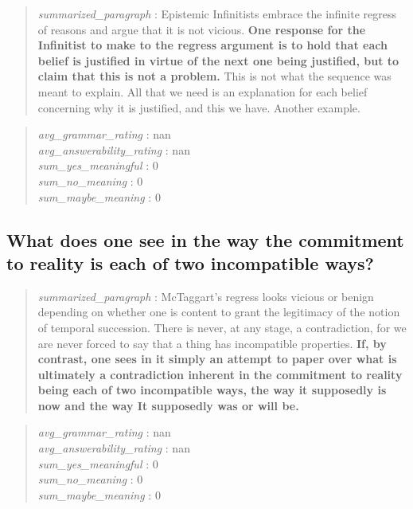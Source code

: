 \begin{quote}
\emph{summarized\_paragraph} : Epistemic Infinitists embrace the
infinite regress of reasons and argue that it is not vicious.
\textbf{One response for the Infinitist to make to the regress argument
is to hold that each belief is justified in virtue of the next one being
justified, but to claim that this is not a problem.} This is not what
the sequence was meant to explain. All that we need is an explanation
for each belief concerning why it is justified, and this we have.
Another example.
\end{quote}

\begin{quote}
\emph{avg\_grammar\_rating} : nan\\
\emph{avg\_answerability\_rating} : nan\\
\emph{sum\_yes\_meaningful} : 0\\
\emph{sum\_no\_meaning} : 0\\
\emph{sum\_maybe\_meaning} : 0
\end{quote}

\hypertarget{what-does-one-see-in-the-way-the-commitment-to-reality-is-each-of-two-incompatible-ways}{%
\subsection{What does one see in the way the commitment to reality is
each of two incompatible
ways?}\label{what-does-one-see-in-the-way-the-commitment-to-reality-is-each-of-two-incompatible-ways}}

\begin{quote}
\emph{summarized\_paragraph} : McTaggart's regress looks vicious or
benign depending on whether one is content to grant the legitimacy of
the notion of temporal succession. There is never, at any stage, a
contradiction, for we are never forced to say that a thing has
incompatible properties. \textbf{If, by contrast, one sees in it simply
an attempt to paper over what is ultimately a contradiction inherent in
the commitment to reality being each of two incompatible ways, the way
it supposedly is now and the way It supposedly was or will be.}
\end{quote}

\begin{quote}
\emph{avg\_grammar\_rating} : nan\\
\emph{avg\_answerability\_rating} : nan\\
\emph{sum\_yes\_meaningful} : 0\\
\emph{sum\_no\_meaning} : 0\\
\emph{sum\_maybe\_meaning} : 0
\end{quote}

